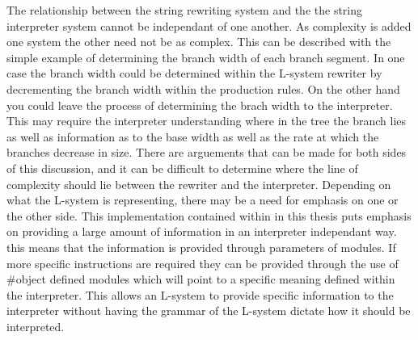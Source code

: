 
The relationship between the string rewriting system and the the string interpreter system cannot be independant of one another. As complexity is added one system the other need not be as complex. This can be described with the simple example of determining the branch width of each branch segment. In one case the branch width could be determined within the L-system rewriter by decrementing the branch width within the production rules. On the other hand you could leave the process of determining the brach width to the interpreter. This may require the interpreter understanding where in the tree the branch lies as well as information as to the base width as well as the rate at which the branches decrease in size. There are arguements that can be made for both sides of this discussion, and it can be difficult to determine where the line of complexity should lie between the rewriter and the interpreter. Depending on what the L-system is representing, there may be a need for emphasis on one or the other side. This implementation contained within in this thesis puts emphasis on providing a large amount of information in an interpreter independant way. this means that the information is provided through parameters of modules. If more specific instructions are required they can be provided through the use of \#object defined modules which will point to a specific meaning defined within the interpreter. This allows an L-system to provide specific information to the interpreter without having the grammar of the L-system dictate how it should be interpreted.